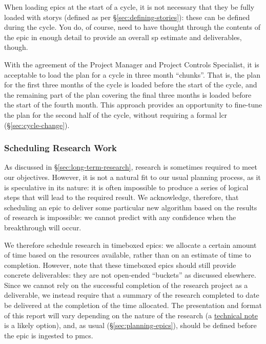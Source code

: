 When loading \glspl{epic} at the start of a \gls{cycle}, it is not necessary that they be fully loaded with \glspl{story} (defined as per \S\ref{sec:defining-stories}): these can be defined during the \gls{cycle}.
You do, of course, need to have thought through the contents of the \gls{epic} in enough detail to provide an overall \gls{sp} estimate and deliverables, though.

With the agreement of the Project Manager and Project Controls Specialist, it is acceptable to load the plan for a \gls{cycle} in three month ``chunks''.
That is, the plan for the first three months of the \gls{cycle} is loaded before the start of the \gls{cycle}, and the remaining part of the plan covering the final three months is loaded before the start of the fourth month.
This approach provides an opportunity to fine-tune the plan for the second half of the \gls{cycle}, without requiring a formal \gls{lcr} (\S\ref{sec:cycle-change}).

\subsubsection{Scheduling Research Work}\label{scheduling-research-work}

As discussed in \S\ref{sec:long-term-research}, research is sometimes required
to meet our objectives. However, it is not a natural fit to our usual
planning process, as it is speculative in its nature: it is often
impossible to produce a series of logical steps that will lead to the
required result. We acknowledge, therefore, that scheduling an \gls{epic} to
deliver some particular new algorithm based on the results of research
is impossible: we cannot predict with any confidence when the
breakthrough will occur.

We therefore schedule research in \gls{timebox}ed \glspl{epic}: we allocate a certain amount of time based on the resources available, rather than on an estimate of time to completion.
However, note that these \gls{timebox}ed \glspl{epic} should still provide concrete deliverables: they are not open-ended ``buckets'' as discussed elsewhere.
Since we cannot rely on the successful completion of the research project as a deliverable, we instead require that a summary of the research completed to date be delivered at the completion of the time allocated.
The presentation and format of this report will vary depending on the nature of the research (a \href{https://sqr-000.lsst.io/}{technical note} is a likely option), and, as usual (\S\ref{sec:planning-epics}), should be defined before the \gls{epic} is ingested to \gls{pmcs}.

